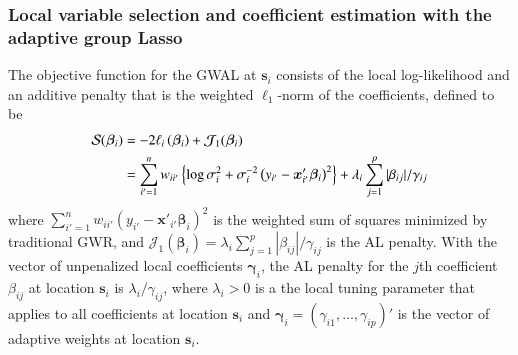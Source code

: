 \documentclass[authoryear, review, 11pt]{elsarticle}
\begin{document}
	\subsubsection{Local variable selection and coefficient estimation with the adaptive group Lasso}
	The objective function for the GWAL at $\bm{s}_i$ consists of the local log-likelihood and an additive penalty that is the weighted $\ell_1$-norm of the coefficients, defined to be
	\begin{align}\label{eq:adaptive-lasso-WLS}
		\mathcal{S}(\bm{\beta}_i) &= -2\ell_i\left(\bm{\beta}_i\right) + \mathcal{J}_1(\bm{\beta}_i) \notag \\
		&= \sum_{i'=1}^n w_{ii'}  \left\{ \log{\sigma^2_i}  + \sigma^{-2}_i  \left(y_{i'} - \bm{x}'_{i'} \bm{\beta}_i \right)^2 \right\} +  \lambda_i \sum_{j=1}^p |\beta_{ij}| / \gamma_{ij}
	\end{align}
	where $\sum_{i'=1}^n w_{ii'} \left(y_{i'} - \bm{x}'_{i'} \bm{\beta}_i \right)^2$ is the weighted sum of squares minimized by traditional GWR, and $\mathcal{J}_1(\bm{\beta}_i) = \lambda_i \sum_{j=1}^p |\beta_{ij}| / \gamma_{ij}$ is the AL penalty. With the vector of unpenalized local coefficients $\bm{\gamma}_i$, the AL penalty for the $j$th coefficient $\beta_{ij}$ at location $\bm{s}_i$ is $\lambda_i / \gamma_{ij}$, where $\lambda_i > 0$ is a the local tuning parameter that applies to all coefficients at location $\bm{s}_i$ and $\bm{\gamma}_i = \left(\gamma_{i1}, \dots, \gamma_{ip}\right)'$ is the vector of adaptive weights at location $\bm{s}_i$.
\end{document}
